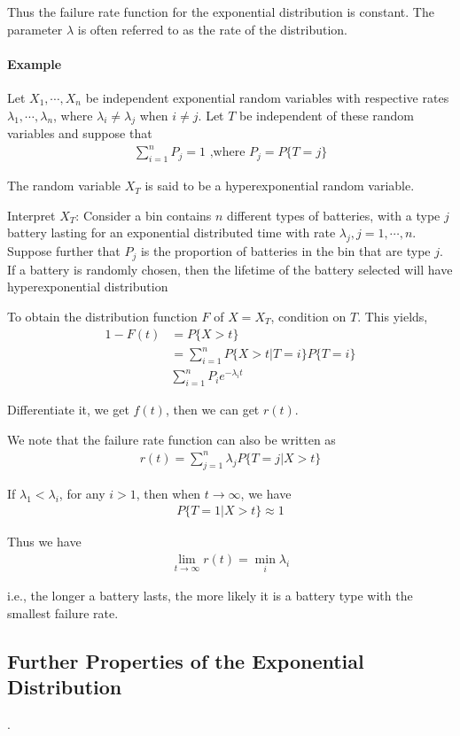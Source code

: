 \documentclass[10 pt,final]{article}
\newcommand{\impo}[1]{{\color{magenta} #1}}
\begin{document}
Thus the failure rate function for the exponential distribution is constant. The parameter $\lambda$ is often referred to as the rate of the distribution.

\paragraph{Example} Let $X_1, \cdots, X_n$ be independent exponential random variables with respective rates $\lambda_1, \cdots, \lambda_n$, where $\lambda_i \neq \lambda_j$ when $i \neq j$. Let $T$ be independent of these random variables and suppose that
\begin{align*}
\sum^n_{i=1} P_j = 1  \mbox{ ,where $P_j = P\{T = j\}$}
\end{align*}

The random variable $X_T$ is said to be a \impo{hyperexponential random variable}. 

\impo{Interpret $X_T$:} Consider a bin contains $n$ different types of batteries, with a type $j$ battery lasting for an exponential distributed time with rate $\lambda_j, j=1, \cdots, n$. Suppose further that $P_j$ is the proportion of batteries in the bin that are type $j$.  If a battery is randomly chosen, then the lifetime of the battery selected will have \impo{hyperexponential distribution}

To obtain the distribution function $F$ of $X= X_T$, condition on $T$. This yields,
\begin{align*}
1 - F(t) & = P\{X>t\} \\
& = \sum^n_{i=1} P\{X>t|T=i\} P\{T=i\} \\
& \sum^n_{i=1} P_i e^{-\lambda_i t}
\end{align*}

Differentiate it, we get $f(t)$, then we can get $r(t)$. 

We note that the failure rate function can also be written as
\begin{align*}
r(t) = \sum^n_{j=1} \lambda_j P\{T=j |X>t\}
\end{align*}

If $\lambda_1 < \lambda_i$, for any $i>1$, then when $t \to \infty$, we have
\begin{align*}
P\{T=1| X>t\}  \approx 1
\end{align*}

Thus we have
\begin{align*}
\lim_{t \to \infty} r(t) = \min_{i} \lambda_i
\end{align*}

i.e., the longer a battery lasts, the more likely it is a battery type with the smallest failure rate.

\subsection{Further Properties of the Exponential Distribution}
.%
\end{document}
